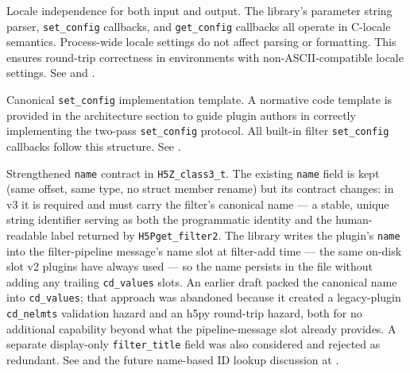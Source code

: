 \documentclass[../RFC-HDFG-2026-001.tex]{subfiles}
\begin{document}
Locale independence for both input and output. The library's parameter
string parser, \texttt{set\_config} callbacks, and \texttt{get\_config} callbacks
all operate in C-locale semantics. Process-wide locale settings do not
affect parsing or formatting. This ensures round-trip correctness in
environments with non-ASCII-compatible locale settings. See
 and .

Canonical \texttt{set\_config} implementation template. A normative code
template is provided in the architecture section to guide plugin authors in
correctly implementing the two-pass \texttt{set\_config} protocol. All built-in
filter \texttt{set\_config} callbacks follow this structure. See
.

Strengthened \texttt{name} contract in \texttt{H5Z\_class3\_t}.  The
existing \texttt{name} field is kept (same offset, same type, no
struct member rename) but its contract changes: in v3 it is required
and must carry the filter's canonical name --- a stable, unique
string identifier serving as both the programmatic identity and the
human-readable label returned by \texttt{H5Pget\_filter2}.  The
library writes the plugin's \texttt{name} into the filter-pipeline
message's name slot at filter-add time --- the same on-disk slot v2
plugins have always used --- so the name persists in the file without
adding any trailing \texttt{cd\_values} slots.  An earlier draft
packed the canonical name into \texttt{cd\_values}; that approach was
abandoned because it created a legacy-plugin \texttt{cd\_nelmts}
validation hazard and an h5py round-trip hazard, both for no
additional capability beyond what the pipeline-message slot already
provides.  A separate display-only \texttt{filter\_title} field was
also considered and rejected as redundant.  See
 and the future name-based ID lookup
discussion at .
\end{document}
